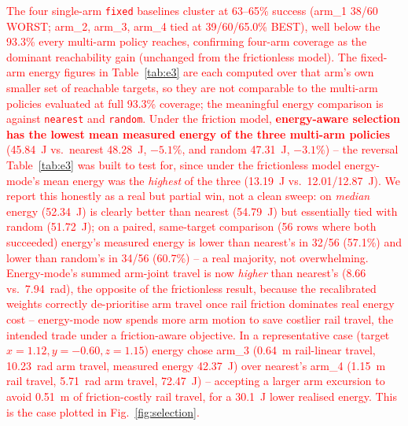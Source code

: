 \documentclass[conference]{IEEEtran}
\begin{document}
\textcolor{red}{The four single-arm \texttt{fixed} baselines cluster at 63--65\%
success (arm\_1 38/60 WORST; arm\_2, arm\_3, arm\_4 tied at 39/60/65.0\% BEST),
well below the 93.3\% every multi-arm policy reaches, confirming four-arm
coverage as the dominant reachability gain (unchanged from the frictionless
model). The fixed-arm energy figures in Table~\ref{tab:e3} are each computed over
that arm's own smaller set of reachable targets, so they are not comparable to the
multi-arm policies evaluated at full 93.3\% coverage; the meaningful energy
comparison is against \texttt{nearest} and \texttt{random}. Under the
friction model, \textbf{energy-aware selection has the lowest mean measured
energy of the three multi-arm policies} (45.84~J vs.\ nearest 48.28~J,
$-5.1\%$, and random 47.31~J, $-3.1\%$) -- the reversal Table~\ref{tab:e3} was
built to test for, since under the frictionless model energy-mode's mean energy
was the \emph{highest} of the three (13.19~J vs.\ 12.01/12.87~J). We report this
honestly as a real but partial win, not a clean sweep: on \emph{median} energy
(52.34~J) is clearly better than nearest (54.79~J) but essentially tied with
random (51.72~J); on a paired, same-target comparison (56 rows where both
succeeded) energy's measured energy is lower than nearest's in 32/56 (57.1\%) and
lower than random's in 34/56 (60.7\%) -- a real majority, not overwhelming.
Energy-mode's summed arm-joint travel is now \emph{higher} than nearest's (8.66
vs.\ 7.94~rad), the opposite of the frictionless result, because the
recalibrated weights correctly de-prioritise arm travel once rail friction
dominates real energy cost -- energy-mode now spends more arm motion to save
costlier rail travel, the intended trade under a friction-aware objective. In a
representative case (target $x{=}1.12,y{=}-0.60,z{=}1.15$) energy chose arm\_3
(0.64~m rail-linear travel, 10.23~rad arm travel, measured energy 42.37~J) over
nearest's arm\_4 (1.15~m rail travel, 5.71~rad arm travel, 72.47~J) -- accepting
a larger arm excursion to avoid 0.51~m of friction-costly rail travel, for a
30.1~J lower realised energy. This is the case plotted in
Fig.~\ref{fig:selection}.}
\end{document}
